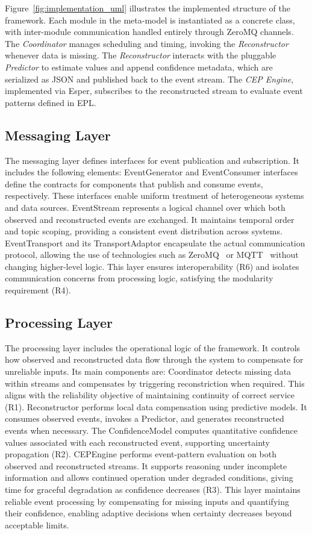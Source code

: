 Figure~\ref{fig:implementation_uml} illustrates the implemented structure of the framework.
Each module in the meta-model is instantiated as a concrete class, with inter-module communication handled entirely through ZeroMQ channels.
The \textit{Coordinator} manages scheduling and timing, invoking the \textit{Reconstructor} whenever data is missing.
The \textit{Reconstructor} interacts with the pluggable \textit{Predictor} to estimate values and append confidence metadata, which are serialized as JSON and published back to the event stream.
The \textit{CEP Engine}, implemented via Esper, subscribes to the reconstructed stream to evaluate event patterns defined in EPL.



\subsection{Messaging Layer}
The messaging layer defines interfaces for event publication and subscription. It includes the following elements:
EventGenerator and EventConsumer interfaces define the contracts for components that publish and consume events, respectively. These interfaces enable uniform treatment of heterogeneous systems and data sources.
EventStream represents a logical channel over which both observed and reconstructed events are exchanged.
It maintains temporal order and topic scoping, providing a consistent event distribution across systems.
EventTransport and its TransportAdaptor encapsulate the actual communication protocol, allowing the use of technologies such as ZeroMQ~\cite{zeromq_org} or MQTT~\cite{mqttspec} without changing higher-level logic.
This layer  ensures interoperability (R6) and isolates communication concerns from processing logic, satisfying the modularity requirement (R4).

\subsection{Processing Layer}
The processing layer includes the operational logic of the framework. It controls how observed and reconstructed data flow through the system to compensate for unreliable inputs. Its main components are:
Coordinator detects missing data within streams and compensates by triggering reconstriction when required.
This aligns with the reliability objective of maintaining continuity of correct service (R1).
Reconstructor performs local data compensation using predictive models. It consumes observed events, invokes a Predictor, and generates reconstructed events when necessary. The ConfidenceModel computes quantitative confidence values associated with each reconstructed event, supporting uncertainty propagation (R2).
CEPEngine performs event-pattern evaluation on both observed and reconstructed streams.
It supports reasoning under incomplete information and allows continued operation under degraded conditions, giving time for graceful degradation as confidence decreases (R3).
This layer maintains reliable event processing by compensating for missing inputs and quantifying their confidence, enabling adaptive decisions when certainty decreases beyond acceptable limits.

